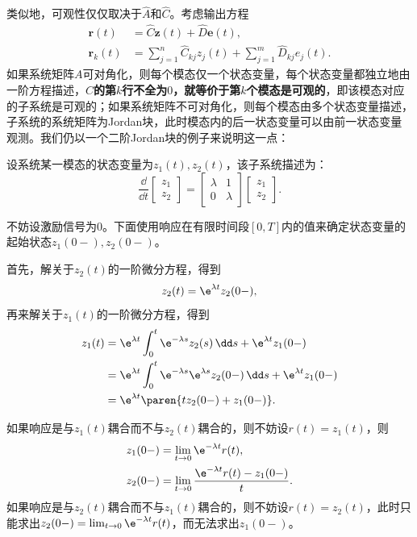 类似地，可观性仅仅取决于$\hat{A}$和$\hat{C}$。考虑输出方程
\begin{align}
    \mathbf{r}(t)&=\hat{C}\mathbf{z}(t)+\hat{D}\mathbf{e}(t),\\
    \mathbf{r}_k(t)&=\sum_{j=1}^n \hat{C}_{kj} z_j(t)+\sum_{j=1}^m \hat{D}_{kj} e_j(t).
\end{align}
如果系统矩阵$A$可对角化，则每个模态仅一个状态变量，每个状态变量都独立地由一阶方程描述，\textbf{$\hat{C}$的第$k$行不全为$0$，就等价于第$k$个模态是可观的}，即该模态对应的子系统是可观的；如果系统矩阵不可对角化，则每个模态由多个状态变量描述，子系统的系统矩阵为Jordan块，此时模态内的后一状态变量可以由前一状态变量观测。我们仍以一个二阶Jordan块的例子来说明这一点：
\begin{example}
    设系统某一模态的状态变量为$z_1(t),z_2(t)$，该子系统描述为：
    \begin{equation}
        \frac{\dd}{\dd t}\begin{bmatrix}
        z_1\\
        z_2
        \end{bmatrix}=\begin{bmatrix}
        \lambda & 1\\
        0 & \lambda
        \end{bmatrix}\begin{bmatrix}
        z_1\\
        z_2
        \end{bmatrix}.
    \end{equation}

    不妨设激励信号为$0$。下面使用响应在有限时间段$[0,T]$内的值来确定状态变量的起始状态$z_1(0-),z_2(0-)$。

    首先，解关于$z_2(t)$的一阶微分方程，得到
    \begin{equation}
        z_2(t)=\e^{\lambda t}z_2(0-),
    \end{equation}
    再来解关于$z_1(t)$的一阶微分方程，得到
    \begin{align}
        z_1(t)&=\e^{\lambda t}\int_0^t \e^{-\lambda s}z_2(s)\,\dd s+\e^{\lambda t}z_1(0-)\nonumber\\
        &=\e^{\lambda t}\int_0^t \e^{-\lambda s}\e^{\lambda s}z_2(0-)\,\dd s+\e^{\lambda t}z_1(0-)\nonumber\\
        &=\e^{\lambda t}\paren{tz_2(0-)+z_1(0-)}.
    \end{align}

    如果响应是与$z_1(t)$耦合而不与$z_2(t)$耦合的，则不妨设$r(t)=z_1(t)$，则
    \begin{align}
        z_1(0-)&=\lim_{t\to 0} \e^{-\lambda t}r(t),\\
        z_2(0-)&=\lim_{t\to 0} \frac{\e^{-\lambda t}r(t)-z_1(0-)}{t}.
    \end{align}
    如果响应是与$z_2(t)$耦合而不与$z_1(t)$耦合的，则不妨设$r(t)=z_2(t)$，此时只能求出$z_2(0-)=\lim_{t\to 0} \e^{-\lambda t}r(t)$，而无法求出$z_1(0-)$。
\end{example}

